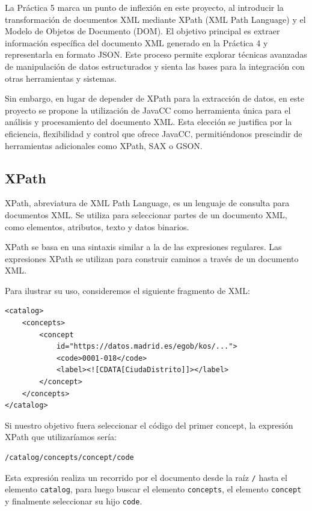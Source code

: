 \noindent La Práctica 5 marca un punto de inflexión en este proyecto, al introducir la transformación de documentos XML mediante XPath (XML Path Language) y el Modelo de Objetos de Documento (DOM). El objetivo principal es extraer información específica del documento XML generado en la Práctica 4 y representarla en formato JSON. Este proceso permite explorar técnicas avanzadas de manipulación de datos estructurados y sienta las bases para la integración con otras herramientas y sistemas.

Sin embargo, en lugar de depender de XPath para la extracción de datos, en este proyecto se propone la utilización de JavaCC como herramienta única para el análisis y procesamiento del documento XML. Esta elección se justifica por la eficiencia, flexibilidad y control que ofrece JavaCC, permitiéndonos prescindir de herramientas adicionales como XPath, SAX o GSON.

\subsection{XPath}

XPath, abreviatura de XML Path Language, es un lenguaje de consulta para documentos XML. Se utiliza para seleccionar partes de un documento XML, como elementos, atributos, texto y datos binarios.

XPath se basa en una sintaxis similar a la de las expresiones regulares. Las expresiones XPath se utilizan para construir caminos a través de un documento XML.

Para ilustrar su uso, consideremos el siguiente fragmento de XML:

\lstset{inputencoding=utf8/latin1}
\begin{lstlisting}
<catalog>
    <concepts>
        <concept
            id="https://datos.madrid.es/egob/kos/...">
            <code>0001-018</code>
            <label><![CDATA[CiudaDistrito]]></label>
        </concept>
    </concepts>
</catalog>

\end{lstlisting}

Si nuestro objetivo fuera seleccionar el código del primer concept, la expresión XPath que utilizaríamos sería:

\lstset{inputencoding=utf8/latin1}
\begin{lstlisting}
/catalog/concepts/concept/code
\end{lstlisting}

Esta expresión realiza un recorrido por el documento desde la raíz \lstinline|/| hasta el elemento \lstinline|catalog|, para luego buscar el elemento \lstinline|concepts|, el elemento \lstinline|concept| y finalmente seleccionar su hijo \lstinline|code|.

